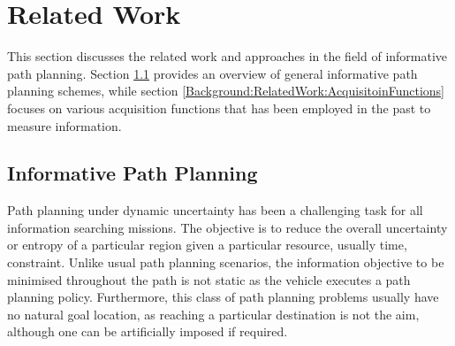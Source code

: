 %		
%		
		
	\section{Related Work}
	\label{Background:RelatedWork}
		
		This section discusses the related work and approaches in the field of informative path planning. Section \ref{Background:RelatedWork:InformativePathPlanning} provides an overview of general informative path planning schemes, while section \ref{Background:RelatedWork:AcquisitoinFunctions} focuses on various acquisition functions that has been employed in the past to measure information.
				
		\subsection{Informative Path Planning}
		\label{Background:RelatedWork:InformativePathPlanning}
			
			Path planning under dynamic uncertainty has been a challenging task for all information searching missions. The objective is to reduce the overall uncertainty or entropy of a particular region given a particular resource, usually time, constraint. Unlike usual path planning scenarios, the information objective to be minimised throughout the path is not static as the vehicle executes a path planning policy. Furthermore, this class of path planning problems usually have no natural goal location, as reaching a particular destination is not the aim, although one can be artificially imposed if required.
		
